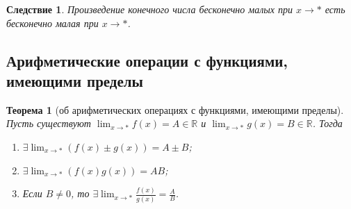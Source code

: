 \documentclass[a4paper,12pt]{article} %
\newtheorem{theorem}{Теорема}[section]
\newtheorem{corollary}{Следствие}[theorem]
\theoremstyle{remark}
\theoremstyle{definition}
\begin{document}
\begin{corollary}
	Произведение конечного числа бесконечно малых при $x \to  *$ есть бесконечно малая при $x \to *$.
\end{corollary}

\subsection{Арифметические операции с функциями, имеющими пределы}

\begin{theorem}[об арифметических операциях с функциями, имеющими пределы]
	Пусть существуют $\displaystyle \lim_{x \to *} f(x) = A \in  \mathbb{R}$ и $\displaystyle \lim_{x \to *} g(x) = B\in  \mathbb{R}$.
	Тогда
	\begin{enumerate}
		\item $\displaystyle \exists \lim_{x \to *} (f(x) \pm g(x)) = A\pm B$;
		\item $\displaystyle \exists \lim_{x \to *} (f(x) g(x)) = AB$;
		\item Если $B \neq 0$, то $\displaystyle \exists  \lim_{x \to *} \frac{f(x)}{g(x)} = \frac{A}{B}$.
	\end{enumerate}
\end{theorem}
\end{document}
